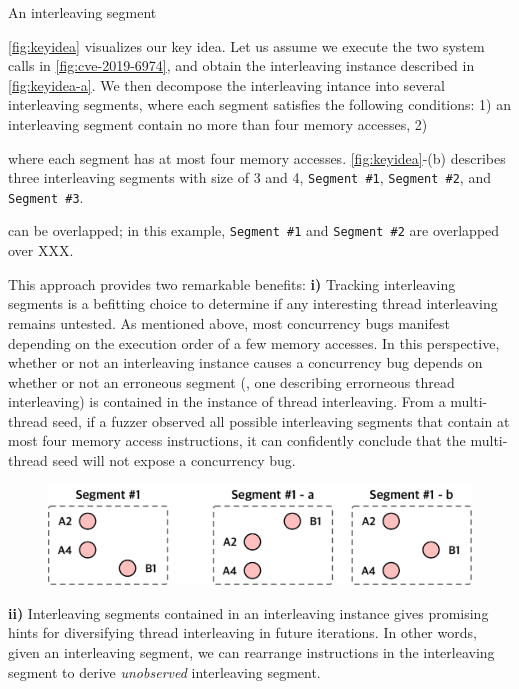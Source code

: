 An interleaving segment 


\autoref{fig:keyidea} visualizes our key idea.
%
Let us assume we execute the two system calls in
\autoref{fig:cve-2019-6974}, and obtain the interleaving instance
described in \autoref{fig:keyidea-a}.
%
We then decompose the interleaving intance into several interleaving
segments, where each segment satisfies the following conditions:
%
1) an interleaving segment contain no more than four memory accesses,
%
2) 

where each segment has at most four memory accesses.
%
\autoref{fig:keyidea}-(b) describes three interleaving segments with
size of 3 and 4, \texttt{Segment \#1}, \texttt{Segment \#2}, and
\texttt{Segment \#3}.



can be overlapped; in this example,
\texttt{Segment \#1} and \texttt{Segment \#2} are overlapped over XXX.




%
This approach provides two remarkable benefits:
%
\textbf{i)} Tracking interleaving segments is a befitting choice to
determine if any interesting thread interleaving remains untested.
%
As mentioned above, most concurrency bugs manifest depending on the
execution order of a few memory accesses.
%
In this perspective, whether or not an interleaving instance causes a
concurrency bug depends on whether or not an erroneous segment (\ie,
one describing errorneous thread interleaving) is contained in the
instance of thread interleaving.
%
From a multi-thread seed, if a fuzzer observed all possible
interleaving segments that contain at most four memory access
instructions, it can confidently conclude that the multi-thread seed
will not expose a concurrency bug.
%


\begin{figure}[t]
  \centering
  \includegraphics[width=0.9\linewidth]{fig/hint.pdf}
  \caption{}
  \label{fig:hint}
\end{figure}
%
\textbf{ii)} Interleaving segments contained in an interleaving
instance gives promising hints for diversifying thread interleaving in
future iterations.
%
In other words, given an interleaving segment, we can rearrange
instructions in the interleaving segment to derive \textit{unobserved}
interleaving segment.

